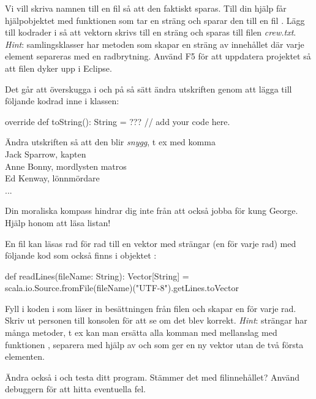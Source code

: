 \Subtask Vi vill skriva namnen till en fil så att den faktiskt sparas. Till din hjälp får hjälpobjektet  med funktionen  som tar en sträng  och sparar den till en fil . Lägg till kodrader i  så att vektorn skrivs till en sträng och sparas till filen \emph{crew.txt}. \emph{Hint}: samlingsklasser har metoden  som skapar en sträng av innehållet där varje element separeras med en radbrytning. Använd F5 för att uppdatera projektet så att filen dyker upp i Eclipse.



\Subtask Det går att överskugga  i  och på så sätt ändra utskriften genom att lägga till följande kodrad inne i klassen: 
\begin{Code}
override def toString(): String = ??? // add your code here. 
\end{Code}

\noindent Ändra utskriften så att den blir {\em snygg}, t ex med komma\\ 

\noindent Jack Sparrow, kapten \\
Anne Bonny, mordlysten matros \\
Ed Kenway, lönnmördare \\
... 

{}

\Subtask Din moraliska kompass hindrar dig inte från att också jobba för kung George. Hjälp honom att läsa listan!

En fil  kan läsas rad för rad till en vektor med strängar (en för varje rad) med följande kod som också finns i objektet : 

\begin{CodeSmall}
  def readLines(fileName: String): Vector[String] =
    scala.io.Source.fromFile(fileName)("UTF-8").getLines.toVector
\end{CodeSmall}


Fyll i koden i  som läser in besättningen från filen och skapar en  för varje rad. Skriv ut personen till konsolen för att se om det blev korrekt. \emph{Hint}: strängar har många metoder, t ex kan man ersätta alla komman med mellanslag med funktionen , separera med hjälp av  och  som ger en ny vektor utan de två första elementen.

\Subtask Ändra också i  och testa ditt program. Stämmer det med filinnehållet? Använd debuggern  för att hitta eventuella fel.

